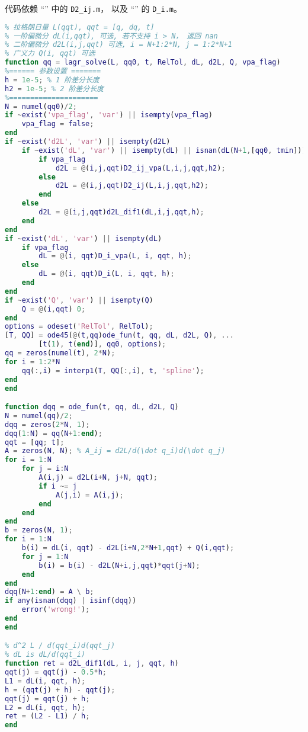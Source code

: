 代码依赖 “” 中的 \verb|D2_ij.m|， 以及 “” 的 \verb|D_i.m|。
\begin{lstlisting}[language=matlab, caption=lagr\_solve.m]
% 数值解拉格朗日方程
% 拉格朗日量 L(qqt), qqt = [q, dq, t]
% 一阶偏微分 dL(i,qqt), 可选, 若不支持 i > N， 返回 nan
% 二阶偏微分 d2L(i,j,qqt) 可选, i = N+1:2*N, j = 1:2*N+1
% 广义力 Q(i, qqt) 可选
function qq = lagr_solve(L, qq0, t, RelTol, dL, d2L, Q, vpa_flag)
%====== 参数设置 =======
h = 1e-5; % 1 阶差分长度
h2 = 1e-5; % 2 阶差分长度
%=====================
N = numel(qq0)/2;
if ~exist('vpa_flag', 'var') || isempty(vpa_flag)
    vpa_flag = false;
end
if ~exist('d2L', 'var') || isempty(d2L)
    if ~exist('dL', 'var') || isempty(dL) || isnan(dL(N+1,[qq0, tmin]))
        if vpa_flag
            d2L = @(i,j,qqt)D2_ij_vpa(L,i,j,qqt,h2);
        else
            d2L = @(i,j,qqt)D2_ij(L,i,j,qqt,h2);
        end
    else
        d2L = @(i,j,qqt)d2L_dif1(dL,i,j,qqt,h);
    end
end
if ~exist('dL', 'var') || isempty(dL)
    if vpa_flag
        dL = @(i, qqt)D_i_vpa(L, i, qqt, h);
    else
        dL = @(i, qqt)D_i(L, i, qqt, h);
    end
end
if ~exist('Q', 'var') || isempty(Q)
    Q = @(i,qqt) 0;
end
options = odeset('RelTol', RelTol);
[T, QQ] = ode45(@(t,qq)ode_fun(t, qq, dL, d2L, Q), ...
        [t(1), t(end)], qq0, options);
qq = zeros(numel(t), 2*N);
for i = 1:2*N
    qq(:,i) = interp1(T, QQ(:,i), t, 'spline');
end
end

function dqq = ode_fun(t, qq, dL, d2L, Q)
N = numel(qq)/2;
dqq = zeros(2*N, 1);
dqq(1:N) = qq(N+1:end);
qqt = [qq; t];
A = zeros(N, N); % A_ij = d2L/d(\dot q_i)d(\dot q_j)
for i = 1:N
    for j = i:N
        A(i,j) = d2L(i+N, j+N, qqt);
        if i ~= j
            A(j,i) = A(i,j);
        end
    end
end
b = zeros(N, 1);
for i = 1:N
    b(i) = dL(i, qqt) - d2L(i+N,2*N+1,qqt) + Q(i,qqt);
    for j = 1:N
        b(i) = b(i) - d2L(N+i,j,qqt)*qqt(j+N);
    end
end
dqq(N+1:end) = A \ b;
if any(isnan(dqq) | isinf(dqq))
    error('wrong!');
end
end

% d^2 L / d(qqt_i)d(qqt_j)
% dL is dL/d(qqt_i)
function ret = d2L_dif1(dL, i, j, qqt, h)
qqt(j) = qqt(j) - 0.5*h;
L1 = dL(i, qqt, h);
h = (qqt(j) + h) - qqt(j);
qqt(j) = qqt(j) + h;
L2 = dL(i, qqt, h);
ret = (L2 - L1) / h;
end
\end{lstlisting}

